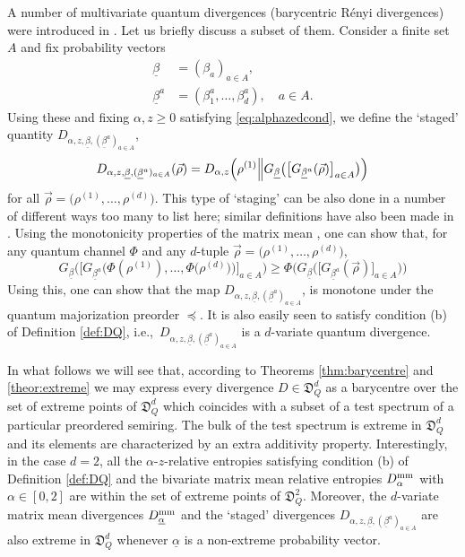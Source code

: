 \documentclass[12pt,a4paper,reqno]{amsart}
\theoremstyle{definition}
\newcommand{\mf}[1]{\mathfrak{#1}}
\let\originalleft\left
\let\originalright\right
\renewcommand{\left}{\mathopen{}\mathclose\bgroup\originalleft}
\renewcommand{\right}{\aftergroup\egroup\originalright}
\begin{document}
A number of multivariate quantum divergences (barycentric R\'{e}nyi divergences) were introduced in \cite{mosonyi2024geometric}. Let us briefly discuss a subset of them. Consider a finite set $A$ and fix probability vectors
\begin{align}
\underline{\beta}&=(\beta_a)_{a\in A},\\
\underline{\beta}^a&=(\beta^a_1,\ldots,\beta^a_d),\quad a\in A.
\end{align}
Using these and fixing $\alpha,z\geq0$ satisfying \eqref{eq:alphazedcond}, we define the `staged' quantity $D_{\alpha,z,\underline{\beta},(\underline{\beta}^a)_{a\in A}}$,
\begin{equation}\label{eq:staged}
D_{\alpha,z,\underline{\beta},(\underline{\beta}^a)_{a\in A}}(\vec{\rho})=D_{\alpha,z}\left(\rho^{(1)}\middle\|G_{\underline{\beta}}\big(\big[G_{\underline{\beta}^a}(\vec{\rho})\big]_{a\in A}\big)\right)
\end{equation}
for all $\vec{\rho}=\big(\rho^{(1)},\ldots,\rho^{(d)}\big)$. This type of `staging' can be also done in a number of different ways too many to list here; similar definitions have also been made in \cite{BuVra2021,Furuya_et_al_2023}. Using the monotonicity properties of the matrix mean \cite{Bhatia_Karandikar_2012}, one can show that, for any quantum channel $\Phi$ and any $d$-tuple $\vec{\rho}=\big(\rho^{(1)},\ldots,\rho^{(d)}\big)$,
$$
G_{\underline{\beta}}\Big(\Big[G_{\underline{\beta}^a}\big(\Phi(\rho^{(1)}),\ldots,\Phi\big(\rho^{(d)}\big)\big)\Big]_{a\in A}\big)\geq\Phi\Big(G_{\underline{\beta}}\big(\big[G_{\underline{\beta}^a}(\vec{\rho})\big]_{a\in A}\big)\Big)
$$
Using this, one can show that the map $D_{\alpha,z,\underline{\beta},(\underline{\beta}^a)_{a\in A}}$, is monotone under the quantum majorization preorder $\preceq$. It is also easily seen to satisfy condition (b) of Definition \ref{def:DQ}, i.e.,\ $D_{\alpha,z,\underline{\beta},(\underline{\beta}^a)_{a\in A}}$ is a $d$-variate quantum divergence.

In what follows we will see that, according to Theorems \ref{thm:barycentre} and \ref{theor:extreme} we may express every divergence $D\in\mf D_Q^d$ as a barycentre over the set of extreme points of $\mf D_Q^d$ which coincides with a subset of a test spectrum of a particular preordered semiring. The bulk of the test spectrum is extreme in $\mf D_Q^d$ and its elements are characterized by an extra additivity property. Interestingly, in the case $d=2$, all the $\alpha$-$z$-relative entropies satisfying condition (b) of Definition \ref{def:DQ} and the bivariate matrix mean relative entropies $D^{\rm mm}_\alpha$ with $\alpha\in[0,2]$ are within the set of extreme points of $\mf D_Q^2$. Moreover, the $d$-variate matrix mean divergences $D^{\rm mm}_{\underline{\alpha}}$ and the `staged' divergences $D_{\alpha,z,\underline{\beta},(\underline{\beta}^a)_{a\in A}}$ are also extreme in $\mf D_Q^d$ whenever $\underline{\alpha}$ is a non-extreme probability vector.
\end{document}
